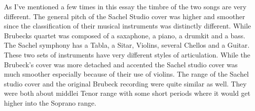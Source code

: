 \documentclass{article}
\begin{document}
As I've mentioned a few times in this essay the timbre of the two songs are very
different. The general pitch of the Sachel Studio cover was higher and smoother
since the classification of their musical instruments was distinctly different.
While Brubecks quartet was composed of a saxaphone, a piano, a drumkit and a
bass. The Sachel symphony has a Tabla, a Sitar, Violins, several Chellos and a
Guitar. These two sets of instruments have very different styles of
articulation. While the Brubeck's cover was more detached and accented the
Sachel studio cover was much smoother especially because of their use of
violins. The range of the Sachel studio cover and the original Brubeck recording
were quite similar as well. They were both about middlei Tenor range with some 
short periods where it would get higher into the Soprano range.
\end{document}
